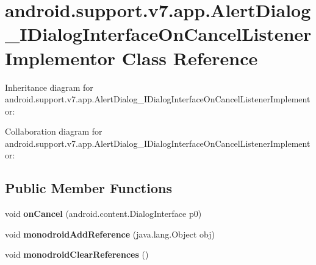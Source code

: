 \hypertarget{classandroid_1_1support_1_1v7_1_1app_1_1_alert_dialog___i_dialog_interface_on_cancel_listener_implementor}{}\section{android.\+support.\+v7.\+app.\+Alert\+Dialog\+\_\+\+I\+Dialog\+Interface\+On\+Cancel\+Listener\+Implementor Class Reference}
\label{classandroid_1_1support_1_1v7_1_1app_1_1_alert_dialog___i_dialog_interface_on_cancel_listener_implementor}


Inheritance diagram for android.\+support.\+v7.\+app.\+Alert\+Dialog\+\_\+\+I\+Dialog\+Interface\+On\+Cancel\+Listener\+Implementor\+:


Collaboration diagram for android.\+support.\+v7.\+app.\+Alert\+Dialog\+\_\+\+I\+Dialog\+Interface\+On\+Cancel\+Listener\+Implementor\+:
\subsection*{Public Member Functions}
\begin{DoxyCompactItemize}
\item 
\mbox{\label{classandroid_1_1support_1_1v7_1_1app_1_1_alert_dialog___i_dialog_interface_on_cancel_listener_implementor_ae2ec072b3df6d4e38f2537cf8b7a4978}} 
void {\bfseries on\+Cancel} (android.\+content.\+Dialog\+Interface p0)
\item 
\mbox{\label{classandroid_1_1support_1_1v7_1_1app_1_1_alert_dialog___i_dialog_interface_on_cancel_listener_implementor_a3d21bf61ee97426dcae3644ed4fe5be4}} 
void {\bfseries monodroid\+Add\+Reference} (java.\+lang.\+Object obj)
\item 
\mbox{\label{classandroid_1_1support_1_1v7_1_1app_1_1_alert_dialog___i_dialog_interface_on_cancel_listener_implementor_a090abc2cc0327da238bc171c57f28c56}} 
void {\bfseries monodroid\+Clear\+References} ()
\end{DoxyCompactItemize}
